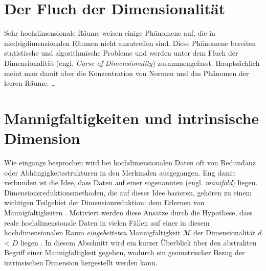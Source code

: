 \section{Der Fluch der Dimensionalität}
\label{ch:Dimensionsreduktion:FluchDerDim}

Sehr hochdimensionale Räume weisen einige Phänomene auf, die in niedrigdimensionalen Räumen nicht
anzutreffen sind. Diese Phänomene bereiten statistische und algorithmische Probleme und werden
unter dem Fluch der Dimensionalität (engl. \textit{Curse of Dimensionality}) zusammengefasst.
Hauptsächlich meint man damit aber die Konzentration von Normen und das Phänomen der leeren Räume.
\ldots

\section{Mannigfaltigkeiten und intrinsische Dimension}
\label{ch:Dimensionsreduktion:MannigfaltigkeitenIntrinsDim}

Wie eingangs besprochen wird bei hochdimensionalen Daten oft von Redundanz oder
Abhängigkeitsstrukturen in den Merkmalen ausgegangen. Eng damit verbunden ist die Idee, dass Daten
auf einer sogenannten  (engl. \textit{manifold}) liegen.
Dimensionsreduktionsmethoden, die auf dieser Idee basieren, gehören zu einem wichtigen Teilgebiet
der Dimensionreduktion: dem Erlernen von Mannigfaltigkeiten \parencite{Cayton.2005}. Motiviert werden diese Ansätze durch die Hypothese, dass reale
hochdimensionale Daten in vielen Fällen auf einer in diesem hochdimensionalen Raum
\textit{eingebetteten} Mannigfaltigkeit $\mathcal{M}$ der Dimensionalität $d$ < $D$ liegen \parencite[vgl.][1]{Cayton.2005}. In diesem Abschnitt wird ein kurzer Überblick über den abstrakten
Begriff einer Mannigfaltigkeit gegeben, wodurch ein geometrischer Bezug der intrinsischen Dimension
hergestellt werden kann.

